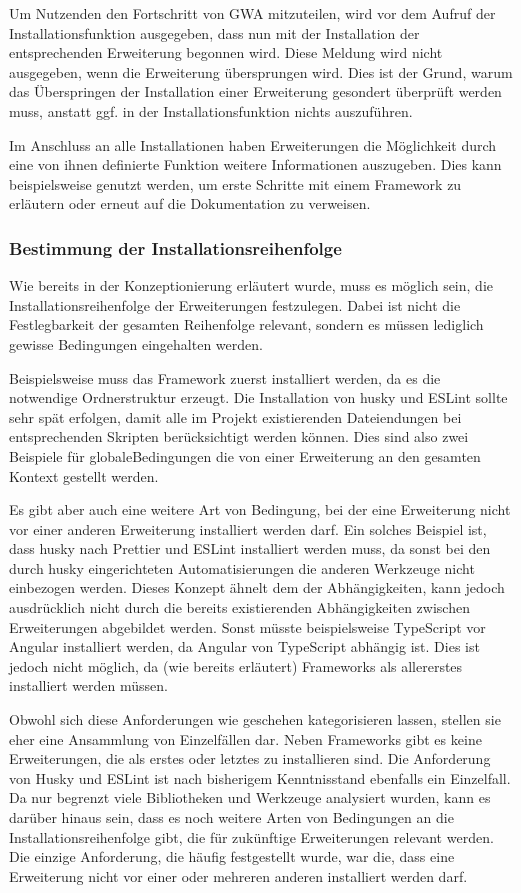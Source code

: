 Um Nutzenden den Fortschritt von \gls{GWA} mitzuteilen, wird vor dem Aufruf der Installationsfunktion ausgegeben, dass nun mit der Installation der entsprechenden Erweiterung begonnen wird. Diese Meldung wird nicht ausgegeben, wenn die Erweiterung übersprungen wird. Dies ist der Grund, warum das Überspringen der Installation einer Erweiterung gesondert überprüft werden muss, anstatt ggf. in der Installationsfunktion nichts auszuführen.

Im Anschluss an alle Installationen haben Erweiterungen die Möglichkeit durch eine von ihnen definierte Funktion weitere Informationen auszugeben. Dies kann beispielsweise genutzt werden, um erste Schritte mit einem Framework zu erläutern oder erneut auf die Dokumentation zu verweisen.

\subsubsection{Bestimmung der Installationsreihenfolge}
\label{impl:determine_installation_order}
Wie bereits in der Konzeptionierung erläutert wurde, muss es möglich sein, die Installationsreihenfolge der Erweiterungen festzulegen. Dabei ist nicht die Festlegbarkeit der gesamten Reihenfolge relevant, sondern es müssen lediglich gewisse Bedingungen eingehalten werden.

Beispielsweise muss das Framework zuerst installiert werden, da es die notwendige Ordnerstruktur erzeugt. Die Installation von husky und ESLint sollte sehr spät erfolgen, damit alle im Projekt existierenden Dateiendungen bei entsprechenden Skripten berücksichtigt werden können. Dies sind also zwei Beispiele für \glqq globale\grqq Bedingungen die von einer Erweiterung an den gesamten Kontext gestellt werden.

Es gibt aber auch eine weitere Art von Bedingung, bei der eine Erweiterung nicht vor einer anderen Erweiterung installiert werden darf. Ein solches Beispiel ist, dass husky nach Prettier und ESLint installiert werden muss, da sonst bei den durch husky eingerichteten Automatisierungen die anderen Werkzeuge nicht einbezogen werden. Dieses Konzept ähnelt dem der Abhängigkeiten, kann jedoch ausdrücklich nicht durch die bereits existierenden Abhängigkeiten zwischen Erweiterungen abgebildet werden. Sonst müsste beispielsweise TypeScript vor Angular installiert werden, da Angular von TypeScript abhängig ist. Dies ist jedoch nicht möglich, da (wie bereits erläutert) Frameworks als allererstes installiert werden müssen.

Obwohl sich diese Anforderungen wie geschehen kategorisieren lassen, stellen sie eher eine Ansammlung von Einzelfällen dar. Neben Frameworks gibt es keine Erweiterungen, die als erstes oder letztes zu installieren sind. Die Anforderung von Husky und ESLint ist nach bisherigem Kenntnisstand ebenfalls ein Einzelfall. Da nur begrenzt viele Bibliotheken und Werkzeuge analysiert wurden, kann es darüber hinaus sein, dass es noch weitere Arten von Bedingungen an die Installationsreihenfolge gibt, die für zukünftige Erweiterungen relevant werden. Die einzige Anforderung, die häufig festgestellt wurde, war die, dass eine Erweiterung nicht vor einer oder mehreren anderen installiert werden darf.


